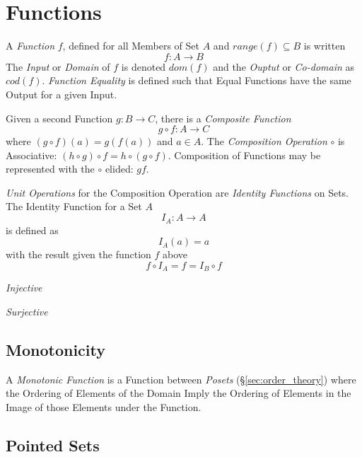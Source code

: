 \documentclass{article}
\begin{document}
\section{Functions}\label{sec:set_functions}

A \emph{Function} $f$, defined for all Members of Set $A$ and $range(f)
\subseteq B$ is written
\[
    f : A \rightarrow B
\]
The \emph{Input} or \emph{Domain} of $f$ is denoted $dom(f)$ and the
\emph{Ouptut} or \emph{Co-domain} as $cod(f)$. \emph{Function
  Equality} is defined such that Equal Functions have the same Output
for a given Input.

Given a second Function $g : B \rightarrow C$, there is a
\emph{Composite Function}
\[
    g \circ f : A \rightarrow C
\]
where $(g \circ f)(a) = g(f(a))$ and $a \in A$. The \emph{Composition
  Operation} $\circ$ is Associative: $(h \circ g) \circ f = h \circ (g
\circ f)$. Composition of Functions may be represented with the
$\circ$ elided: $gf$.

\emph{Unit Operations} for the Composition Operation are
\emph{Identity Functions} on Sets. The Identity Function for a Set $A$
\[
    I_A : A \rightarrow A
\]
is defined as
\[
    I_A(a) = a
\]
with the result given the function $f$ above
\[
    f \circ I_A = f = I_B \circ f
\]

\emph{Injective}

\emph{Surjective}

\subsection{Monotonicity}\label{subsec:monotonicity}

A \emph{Monotonic Function} is a Function between \emph{Posets}
(\S\ref{sec:order_theory}) where the Ordering of Elements of the
Domain Imply the Ordering of Elements in the Image of those Elements
under the Function.

\subsection{Pointed Sets}
\end{document}

